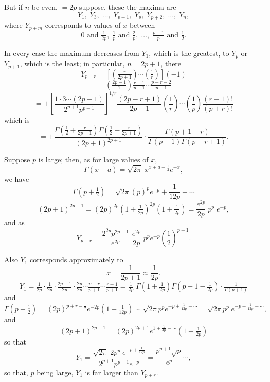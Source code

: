 \documentclass[11pt,a4paper]{book}
\begin{document}
But if $n$ be even, $= 2p$ suppose, these the maxima are
\[
Y_1, \;Y_3, \;\ldots, \;Y_{p-1}, \;Y_p, \;Y_{p+2}, \;\ldots, \;Y_n,
\]
where $Y_{p+m}$ corresponds to values of $x$ between
\[
0 \text{ and } \tfrac{1}{2p}, \; \tfrac{1}{p} \text{ and } \tfrac{2}{p}, \; \ldots, \; \tfrac{p-1}{p} \text{ and } \tfrac{1}{2}.
\]

\clearpage

In every case the maximum decreases from $Y_1$, which is the greatest, to $Y_p$ or $Y_{p+1}$,
which is the least; in particular, $n = 2p + 1$, there
\[
Y_{p+r} = \left[\left(\tfrac{r}{2p+1}\right)\cdots(\tfrac{1}{r})\right](-1)
\]
\[
= \left(\tfrac{2p-1}{1}\right)\tfrac{r-1}{p+1}\cdots\tfrac{p-r-2}{p+1}
\]
\[
= \pm\left[\frac{1 \cdot 3 \cdots (2p-1)}{2^{p+1} p^{p+1}}\right]^{1/r}\frac{(2p-r+1)}{2p+1}\left(\frac{1}{r}\right)\cdots\left(\frac{1}{p}\right)\frac{(r-1)!}{(p+r)!}
\]
which is
\[
= \pm\frac{\Gamma\left(\frac{1}{2}+\tfrac{r}{2p+1}\right)\Gamma\left(\frac{1}{2}-\tfrac{r}{2p+1}\right)}{(2p+1)^{2p+1}}\cdot\frac{\Gamma(p+1-r)}{\Gamma(p+1)\Gamma(p+r+1)}.
\]

Suppose $p$ is large; then, as for large values of $x$,
\[
\Gamma(x+a) = \sqrt{2\pi}\;x^{x+a-\frac{1}{2}}e^{-x},
\]
we have
\[
\Gamma\left(p+\tfrac{1}{2}\right) = \sqrt{2\pi}(p)^{p}e^{-p} + \frac{1}{12p}+ \cdots
\]
\[
\left(2p+1\right)^{2p+1} = \left(2p\right)^{2p}\left(1+\tfrac{1}{2p}\right)^{2p}\left(1+\tfrac{1}{2p}\right)
= \frac{e^{2p}}{2p}\;p^{p}\;e^{-p},
\]
and as
\[
Y_{p+r} = \frac{2^{2p}p^{2p-1}}{e^{2p}}\;\frac{e^{2p}}{2p}\;p^{p}e^{-p}\left(\frac{1}{2}\right)^{p+1}.
\]

Also $Y_1$ corresponds approximately to
\[
x = \frac{1}{2p+1}\approx\frac{1}{2p}.
\]
\[
Y_1 = \tfrac{1}{2p}\cdot\tfrac{1}{2p}\cdot\tfrac{2p-1}{2p}\cdot\tfrac{2p}{2p}\cdots\tfrac{p-r}{p+1}\cdots\tfrac{r-1}{p+1}
= \tfrac{1}{2p}\;\Gamma\left(1+\tfrac{1}{2p}\right)\Gamma\left(p+1-\tfrac{1}{2p}\right) \cdot \tfrac{1}{\Gamma(p+1)}
\]
and
\[
\Gamma(p+\tfrac{1}{2}) = (2p)^{p+r-\frac{1}{2}}e^{-2p}\left(1+\tfrac{1}{12p}\right) \sim \sqrt{2\pi}p^p e^{-p+\frac{1}{12p}-\cdots}
= \sqrt{2\pi}p^p\;e^{-p+\frac{1}{12p}-\cdots},
\]
and
\[
(2p+1)^{2p+1} = (2p)^{2p+1}e^{1+\frac{1}{4p}-\cdots}\left(1+\tfrac{1}{2p}\right)
\]
so that
\[
Y_1 = \frac{\sqrt{2\pi}\;2p^p\;e^{-p+\frac{1}{12p}}}{2^{p+1}p^{p+1}e^{-p}} = \frac{p^{p+1}\sqrt{p}}{e^{p}}\cdots,
\]
so that, $p$ being large, $Y_1$ is far larger than $Y_{p+r}$.

\clearpage

\end{document}
